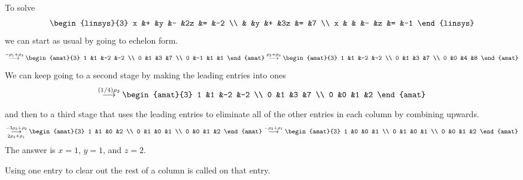 \begin{example}
To solve
\begin{equation*}
  \begin{linsys}{3}
    x  &+  &y  &-  &2z  &=  &-2  \\
       &   &y  &+  &3z  &=  &7   \\
    x  &   &   &-  &z   &=  &-1  
  \end{linsys}
\end{equation*}
we can start as usual by going to echelon form.
\begin{equation*}
  \grstep{-\rho_1+\rho_3}
    \begin{amat}{3}
       1  &1  &-2 &-2  \\
       0  &1  &3  &7   \\
       0  &-1 &1  &1
    \end{amat}
  \grstep{\rho_2+\rho_3}
    \begin{amat}{3}
       1  &1  &-2 &-2  \\
       0  &1  &3  &7   \\
       0  &0  &4  &8
    \end{amat}
\end{equation*}
We can keep going to a second stage
by making the leading entries into ones
\begin{equation*}
    \grstep{(1/4)\rho_3}
    \begin{amat}{3}
       1  &1  &-2 &-2  \\
       0  &1  &3  &7   \\
       0  &0  &1  &2
    \end{amat}
\end{equation*}
and then to a third stage that uses the leading entries 
to eliminate all of the other entries in each column 
by combining upwards.
\begin{equation*}
  \grstep[2\rho_3+\rho_1]{-3\rho_3+\rho_2}
    \begin{amat}{3}
       1  &1  &0  &2   \\
       0  &1  &0  &1   \\
       0  &0  &1  &2
    \end{amat}
  \grstep{-\rho_2+\rho_1}
    \begin{amat}{3}
       1  &0  &0  &1   \\
       0  &1  &0  &1   \\
       0  &0  &1  &2
    \end{amat}
\end{equation*}
The answer is \( x=1 \), \( y=1 \), and \( z=2 \).
\end{example}
Using one entry to clear out the rest of a column is
called  on that entry.

